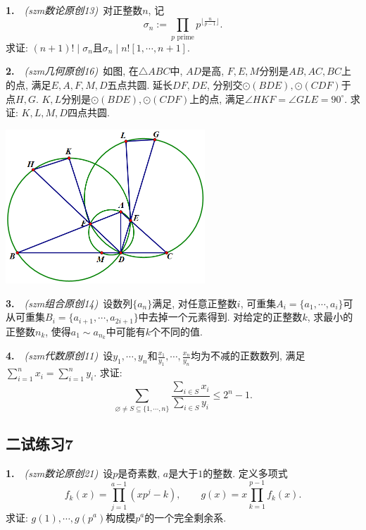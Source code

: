 \textbf{1.}~~\textit{(szm数论原创13)}~对正整数$n$, 记$$\sigma _n := \prod_{p\text{~prime}} p^{\lfloor \frac{n}{p-1} \rfloor}.$$
求证: $(n+1)! \mid \sigma _n$且$\sigma _n \mid n! [1,\cdots ,n+1]$. 

\vspace{20em}

\textbf{2.}~~\textit{(szm几何原创16)}~如图, 在$\triangle ABC$中, $AD$是高, $F,E,M$分别是$AB,AC,BC$上的点, 满足$E,A,F,M,D$五点共圆. 延长$DF,DE$, 分别交$\odot (BDE), \odot (CDF)$于点$H,G$. $K,L$分别是$\odot (BDE), \odot (CDF)$上的点, 满足$\angle HKF =\angle GLE = 90^{\circ}$. 求证: $K,L,M,D$四点共圆. 

\vspace{2em}
\includegraphics[width=7.5cm]{attachment/g16.png}

\newpage

\textbf{3.}~~\textit{(szm组合原创14)}~设数列$\{ a_n \}$满足, 对任意正整数$i$, 可重集$A_i=\{ a_1,\cdots ,a_i \}$可从可重集$B_i=\{ a_{i+1},\cdots ,a_{2i+1} \}$中去掉一个元素得到. 对给定的正整数$k$, 求最小的正整数$n_k$, 使得$a_1 \sim a_{n_k}$中可能有$k$个不同的值. 

\vspace{24em}

\textbf{4.}~~\textit{(szm代数原创11)}~设$y_1,\cdots ,y_n$和$\frac{x_1}{y_1},\cdots ,\frac{x_n}{y_n}$均为不减的正数数列, 满足$\sum_{i=1}^{n}x_i = \sum_{i=1}^{n} y_i$. 求证: $$\sum_{\varnothing \neq S \subseteq \{ 1,\cdots ,n \}} \frac{\sum_{i \in S}x_i}{\sum_{i \in S}y_i} \leq 2^n-1.$$








\newpage
\subsection*{二试练习7}

\textbf{1.}~~\textit{(szm数论原创21)}~设$p$是奇素数, $a$是大于$1$的整数. 定义多项式$$f_k(x) = \prod_{j=1}^{a-1} (xp^j-k),\qquad g(x) = x\prod_{k=1}^{p-1} f_k(x).$$
求证: $g(1),\cdots ,g(p^a)$构成模$p^a$的一个完全剩余系. 

